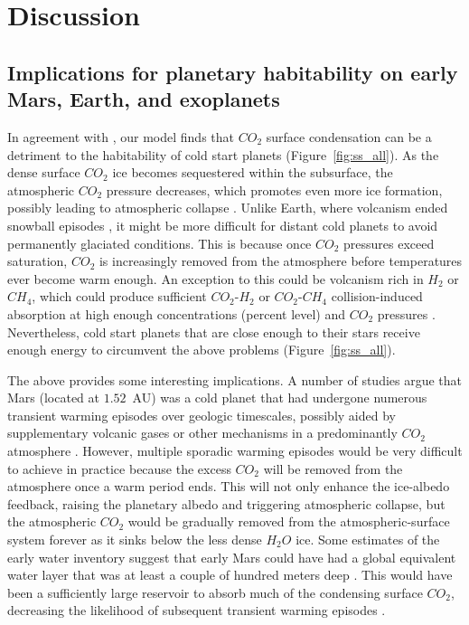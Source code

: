 \documentclass[fleqn,usenatbib]{mnras}
\begin{document}
\section{Discussion}

\subsection{Implications for planetary habitability on early Mars, Earth, and exoplanets}

In agreement with \citet{Turbet2017}, our model finds that $CO_{\mathrm{2}}$ surface condensation can be a detriment to the habitability of cold start planets (Figure~\ref{fig:ss_all}). As the dense surface $CO_{\mathrm{2}}$ ice becomes sequestered within the subsurface, the atmospheric $CO_{\mathrm{2}}$ pressure decreases, which promotes even more ice formation, possibly leading to atmospheric collapse \citep{Turbet2017}. Unlike Earth, where volcanism ended snowball episodes \citep{Hoffman1342}, it might be more difficult for distant cold planets to avoid permanently glaciated conditions. This is because once $CO_{\mathrm{2}}$ pressures exceed saturation, $CO_{\mathrm{2}}$ is increasingly removed from the atmosphere before temperatures ever become warm enough. An exception to this could be volcanism rich in $H_{\mathrm{2}}$ or $CH_{\mathrm{4}}$, which could produce sufficient $CO_{\mathrm{2}}$-$H_{\mathrm{2}}$ or $CO_{\mathrm{2}}$-$CH_{\mathrm{4}}$ collision-induced absorption at high enough concentrations (percent level) and $CO_{\mathrm{2}}$ pressures \citep{ramirez2014,wordsworth_transient_2017,ramirez2017,ramirezkalt2018,turbet_far_2019}. Nevertheless, cold start planets that are close enough to their stars receive enough energy to circumvent the above problems (Figure~\ref{fig:ss_all}). 

The above provides some interesting implications. A number of studies argue that Mars (located at $1.52$~AU) was a cold planet that had undergone numerous transient warming episodes over geologic timescales, possibly aided by supplementary volcanic gases or other mechanisms in a predominantly $CO_{\mathrm{2}}$ atmosphere \citep{wordsworth2013,batalha2016,wordsworth_transient_2017,kite_methane_2020,hayworth_warming_2020}. However, multiple sporadic warming episodes would be very difficult to achieve in practice because the excess $CO_{\mathrm{2}}$ will be removed from the atmosphere once a warm period ends. This will not only enhance the ice-albedo feedback, raising the planetary albedo and triggering atmospheric collapse, but the atmospheric $CO_{\mathrm{2}}$ would be gradually removed from the atmospheric-surface system forever as it sinks below the less dense $H_{\mathrm{2}}O$ ice. Some estimates of the early water inventory suggest that early Mars could have had a global equivalent water layer that was at least a couple of hundred meters deep \citep{villanueva2015,ramirezetal2020}. This would have been a sufficiently large reservoir to absorb much of the condensing surface $CO_{\mathrm{2}}$, decreasing the likelihood of subsequent transient warming episodes \citep{Turbet2017}. 
\end{document}
